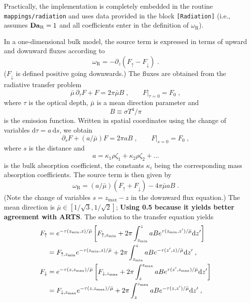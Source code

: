 Practically, the implementation is completely embedded in the routine {\tt mappings/radiation} and uses data provided in the block \texttt{[Radiation]} (i.e., assumes $\mathrm{\bf Da}_\mathrm{R}=1$ and all coefficients enter in the definition of $\omega_\mathrm{R}$). 

In a one-dimensional bulk model, the source term is expressed in terms of upward and downward fluxes according to
\begin{equation}
    \omega_\mathrm{R}=-\partial_z(F_\uparrow -F_\downarrow) \;.
\end{equation}
($F_\downarrow$ is defined positive going downwards.) The fluxes are obtained from the radiative transfer problem
\begin{equation}
    \bar{\mu}\, \partial_\tau F+F = 2\pi\bar{\mu} B\;,\qquad F|_{\tau=0}=F_0 \;,
\end{equation}
where $\tau$ is the optical depth, $\bar{\mu}$ is a mean direction parameter and
\begin{equation}
    B\equiv \sigma T^4/\pi
\end{equation}
is the emission function. Written in spatial coordinates using the change of variables $\mathrm{d}\tau = a\,\mathrm{d}s$, we obtain
\begin{equation}
    \partial_s F+(a/\bar{\mu}) F = 2\pi a B\;,\qquad F|_{s=0}=F_0 \;,
\end{equation}
where $s$ is the distance and 
\begin{equation}
    a = \kappa_1 \rho \zeta_1 + \kappa_2 \rho \zeta_2 + \ldots
\end{equation}
is the bulk absorption coefficient, the constants $\kappa_i$ being the corresponding mass absorption coefficients. The source term is then given by
\begin{equation}
    \omega_\mathrm{R}=(a/\bar{\mu}) (F_\uparrow +F_\downarrow) - 4\pi\bar{\mu} a B \;.
\end{equation}
(Note the change of variables $s=z_\mathrm{max}-z$ in the downward flux equation.) The mean direction is $\bar{\mu}\in[1/\sqrt{3},1/\sqrt{2}]$; \textbf{Using 0.5 because it yields better agreement with ARTS}. The solution to the transfer equation yields
\begin{subequations}\label{rad:flux}
    \begin{align}
        F_\uparrow &= e^{-\tau(z_\mathrm{min},z)/\bar{\mu}}\left[ F_{\uparrow,z_\mathrm{min}} + 2\pi\int_{z_\mathrm{min}}^z a B e^{\tau(z_\mathrm{min},z')/\bar{\mu}}\mathrm{d}z'\right]\notag \\
        &= F_{\uparrow,z_\mathrm{min}}e^{-\tau(z_\mathrm{min},z)/\bar{\mu}}+ 2\pi\int_{z_\mathrm{min}}^z a B e^{-\tau(z',z)/\bar{\mu}}\mathrm{d}z' \;,\\
        F_\downarrow &= e^{-\tau(z,z_\mathrm{max})/\bar{\mu}}\left[ F_{\downarrow,z_\mathrm{max}} + 2\pi\int_z^{z_\mathrm{max}} a B e^{\tau(z',z_\mathrm{max})/\bar{\mu}}\mathrm{d}z'\right]\notag \\
        &=F_{\downarrow,z_\mathrm{max}}e^{-\tau(z,z_\mathrm{max})/\bar{\mu}} + 2\pi\int_z^{z_\mathrm{max}} a B e^{-\tau(z,z')/\bar{\mu}}\mathrm{d}z'\;,
    \end{align}
\end{subequations}

